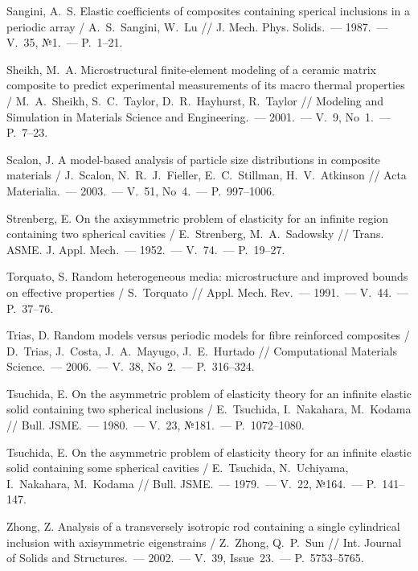 \begin{russian}
\begin{biblist}{99}

Sangini, A.~S. 
Elastic coefficients of composites containing sperical inclusions in a periodic array  
/ A.~S.~Sangini, W.~Lu 
// J. Mech. Phys. Solids.~--- 1987.~--- V.~35, №1.~--- P.~1--21.

Sheikh, M.~A. 
Microstructural finite-element modeling of a ceramic matrix composite to predict experimental measurements of its macro thermal properties 
/ M.~A.~Sheikh, S.~C.~Taylor, D.~R.~Hayhurst, R.~Taylor 
// Modeling and Simulation in Materials Science and Engineering.~--- 2001.~--- V.~9, No~1.~--- P.~7--23.

Scalon, J. 
A model-based analysis of particle size distributions in composite materials 
/ J.~Scalon, N.~R.~J.~Fieller, E.~C.~Stillman, H.~V.~Atkinson 
// Acta Materialia.~--- 2003.~--- V.~51, No~4.~--- P.~997--1006.

Strenberg, E. 
On the axisymmetric problem of elasticity for an infinite region containing two spherical cavities 
/ E.~Strenberg, M.~A.~Sadowsky 
// Trans. ASME. J. Appl. Mech.~--- 1952.~--- V.~74.~--- P.~19--27.

Torquato, S. 
Random heterogeneous media: microstructure and improved bounds on effective properties  
/ S.~Torquato 
// Appl. Mech. Rev.~--- 1991.~--- V.~44.~--- P.~37--76.

Trias, D. 
Random models versus periodic models for fibre reinforced composites 
/ D.~Trias, J.~Costa, J.~A.~Mayugo, J.~E.~Hurtado 
// Computational Materials Science.~--- 2006.~--- V.~38, No~2.~--- P.~316--324.

Tsuchida, E. On the asymmetric problem of elasticity theory for an infinite elastic solid containing two spherical inclusions 
/ E.~Tsuchida, I.~Nakahara, M.~Kodama 
// Bull. JSME.~--- 1980.~--- V.~23, №181.~--- P.~1072--1080.

Tsuchida, E. 
On the asymmetric problem of elasticity theory for an infinite elastic solid containing some spherical cavities 
/ E.~Tsuchida, N.~Uchiyama, I.~Nakahara, M.~Kodama 
// Bull. JSME.~--- 1979.~--- V.~22, №164.~--- P.~141--147.

Zhong, Z. 
Analysis of a transversely isotropic rod containing a single cylindrical inclusion with axisymmetric eigenstrains 
/ Z.~Zhong, Q.~P.~Sun 
// Int. Journal of Solids and Structures.~--- 2002.~--- V.~39, Issue~23.~--- P.~5753--5765.


\end{biblist}
\end{russian}
